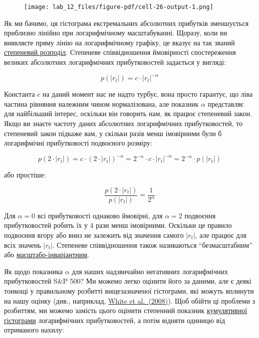 \documentclass[
  letterpaper,
]{report}
\begin{document}
\begin{figure}[H]

{\centering \texttt{[image: lab\_12\_files/figure-pdf/cell-26-output-1.png]}

}

\end{figure}

Як ми бачимо, ця гістограма екстремальних абсолютних прибутків
зменшується приблизно лінійно при логарифмічному масштабуванні. Щоразу,
коли ви виявляєте пряму лінію на логарифмічному графіку, це вказує на
так званий \href{https://en.wikipedia.org/wiki/Power_law}{степеневий
розподіл}. Степеневе співвідношення ймовірності спостереження великих
абсолютних логарифмічних прибутковостей задається у вигляді:

\[
p(|r_t|) = c \cdot |r_t|^{-\alpha}
\]

Константа \(c\) на даний момент нас не надто турбує, вона просто
гарантує, що ліва частина рівняння належним чином нормалізована, але
показник \(\alpha\) представляє для найбільший інтерес, оскільки він
говорить нам, як працює степеневий закон. Якщо ви знаєте частоту даних
абсолютних логарифмічних прибутковостей, то степеневий закон підкаже
вам, у скільки разів менш імовірними були б логарифмічні прибутковості
подвоєного розміру:

\[
p(2 \cdot |r_t|) = c \cdot (2 \cdot |r_t|)^{-\alpha} = 2^{-\alpha} \cdot c \cdot |r_t|^{-\alpha} = 2^{-\alpha} \cdot p(|r_t|)
\]

або простіше:

\[
\frac{p(2 \cdot |r_t|)}{p(|r_t|)} = \frac{1}{2^{\alpha}}
\]

Для \(\alpha = 0\) всі прибутковості однаково ймовірні, для
\(\alpha = 2\) подвоєння прибутковостей робить їх у 4 рази менш
імовірними. Оскільки це правило подвоєння вгору або вниз не залежить від
значення самого \(\left| r_t \right|\), але працює для всіх значень
\(\left| r_t \right|\). Степеневе співвідношення також називаються
``безмасштабним'' або
\href{https://en.wikipedia.org/wiki/Scale_invariance}{масштабо-інваріантним}.

Як щодо показника \(\alpha\) для наших надзвичайно негативних
логарифмічних прибутковостей S\&P 500? Ми можемо легко оцінити його за
даними, але є деякі тонкощі у правильному розбитті вищезазначеної
гістограми, які можуть вплинути на нашу оцінку (див., наприклад,
\href{https://esajournals.onlinelibrary.wiley.com/doi/10.1890/07-1288.1}{White
et al.~(2008)}). Щоб обійти ці проблеми з розбиттям, ми можемо замість
цього оцінити степенний показник
\href{https://en.wikipedia.org/wiki/Histogram\#Cumulative_histogram}{кумулятивної
гістограми} логарифмічних прибутковостей, а потім відняти одиницю від
отриманого нахилу:
\end{document}
